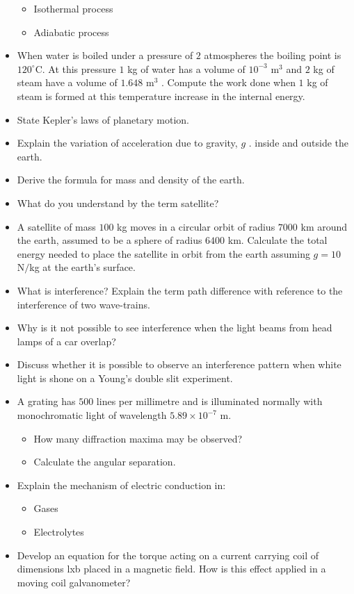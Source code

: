 \documentclass{article}
\begin{document}
\begin{itemize}
\begin{itemize}
\item Isothermal process
\item Adiabatic process
\end{itemize}
\item When water is boiled under a pressure of $ 2$ atmospheres the boiling point is $ 120^{\circ}$C. At this pressure $ 1$ kg of water has a volume of $ 10^{-3}$ m$ ^{3}$ and $ 2$ kg of steam have a volume of $ 1.648$ m$ ^{3}$ . Compute the work done when $ 1$ kg of steam is formed at this temperature increase in the internal energy. 
\item State Kepler's laws of planetary motion.
\item Explain the variation of acceleration due to gravity, $ g$ . inside and outside the earth.
\item Derive the formula for mass and density of the earth.
\item What do you understand by the term satellite?
\item A satellite of mass $ 100$ kg moves in a circular orbit of radius $ 7000$ km around the earth, assumed to be a sphere of radius $ 6400$ km.  Calculate the total energy needed to place the satellite in orbit from the earth assuming $ g=10$ N$/$kg at the earth’s surface.
\item What is interference?  Explain the term path difference with reference to the interference of two wave-trains.
\item Why is it not possible to see interference when the light beams from head lamps of a car overlap?
\item Discuss whether it is possible to observe an interference pattern when white light is shone on a Young’s double slit experiment.
\item A grating has $ 500$ lines per millimetre and is illuminated normally with monochromatic light of wavelength $ 5.89 \times 10^{-7}$ m.
 \begin{itemize}
\item How many diffraction maxima may be observed?
\item Calculate the angular separation.
\end{itemize}
\item Explain the mechanism of electric conduction in:
 \begin{itemize}
\item Gases
\item Electrolytes
\end{itemize}
\item Develop an equation for the torque acting on a current carrying coil of dimensions lxb placed in a magnetic field.  How is this effect applied in a moving coil galvanometer?

\end{itemize}
\end{document}
